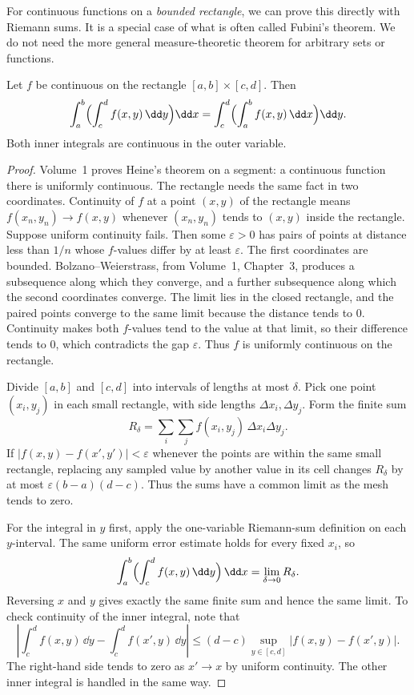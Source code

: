 For continuous functions on a \emph{bounded rectangle}, we can prove this directly with Riemann sums. It is a special case of what is often called Fubini's theorem. We do not need the more general measure-theoretic theorem for arbitrary sets or functions.

\begin{proposition}\label{prop:fubini}
Let $f$ be continuous on the rectangle $[a,b]\times[c,d]$. Then
\[
 \int_a^b\Bigl(\int_c^d f(x,y)\,\dd y\Bigr)\dd x
 =\int_c^d\Bigl(\int_a^b f(x,y)\,\dd x\Bigr)\dd y.
\]
Both inner integrals are continuous in the outer variable.
\end{proposition}
\begin{proof}
Volume~1 proves Heine's theorem on a segment: a continuous function there is uniformly continuous. The rectangle needs the same fact in two coordinates. Continuity of $f$ at a point $(x,y)$ of the rectangle means $f(x_n,y_n)\to f(x,y)$ whenever $(x_n,y_n)$ tends to $(x,y)$ inside the rectangle. Suppose uniform continuity fails. Then some $\varepsilon>0$ has pairs of points at distance less than $1/n$ whose $f$-values differ by at least $\varepsilon$. The first coordinates are bounded. Bolzano--Weierstrass, from Volume~1, Chapter~3, produces a subsequence along which they converge, and a further subsequence along which the second coordinates converge. The limit lies in the closed rectangle, and the paired points converge to the same limit because the distance tends to $0$. Continuity makes both $f$-values tend to the value at that limit, so their difference tends to $0$, which contradicts the gap $\varepsilon$. Thus $f$ is uniformly continuous on the rectangle.

Divide $[a,b]$ and $[c,d]$ into intervals of lengths at most $\delta$. Pick one point $(x_i,y_j)$ in each small rectangle, with side lengths $\Delta x_i,\Delta y_j$. Form the finite sum
\[
 R_\delta=\sum_i\sum_j f(x_i,y_j)\,\Delta x_i\Delta y_j.
\]
If $|f(x,y)-f(x',y')|<\varepsilon$ whenever the points are within the same small rectangle, replacing any sampled value by another value in its cell changes $R_\delta$ by at most $\varepsilon(b-a)(d-c)$. Thus the sums have a common limit as the mesh tends to zero.

For the integral in $y$ first, apply the one-variable Riemann-sum definition on each $y$-interval. The same uniform error estimate holds for every fixed $x_i$, so
\[
 \int_a^b\Bigl(\int_c^d f(x,y)\,\dd y\Bigr)\,\dd x
 =\lim_{\delta\to0}R_\delta.
\]
Reversing $x$ and $y$ gives exactly the same finite sum and hence the same limit. To check continuity of the inner integral, note that
\[
 \left|\int_c^d f(x,y)\,\dd y-\int_c^d f(x',y)\,\dd y\right|
 \le(d-c)\sup_{y\in[c,d]}|f(x,y)-f(x',y)|.
\]
The right-hand side tends to zero as $x'\to x$ by uniform continuity. The other inner integral is handled in the same way.
\end{proof}


